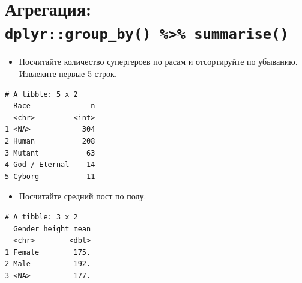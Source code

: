 \documentclass[
]{book}
\newenvironment{Shaded}{\begin{snugshade}}{\end{snugshade}}
\newcommand{\DataTypeTok}[1]{\textcolor[rgb]{0.13,0.29,0.53}{#1}}
\newcommand{\DecValTok}[1]{\textcolor[rgb]{0.00,0.00,0.81}{#1}}
\newcommand{\KeywordTok}[1]{\textcolor[rgb]{0.13,0.29,0.53}{\textbf{#1}}}
\newcommand{\NormalTok}[1]{#1}
\newcommand{\OperatorTok}[1]{\textcolor[rgb]{0.81,0.36,0.00}{\textbf{#1}}}
\newcommand{\OtherTok}[1]{\textcolor[rgb]{0.56,0.35,0.01}{#1}}
\newcommand{\StringTok}[1]{\textcolor[rgb]{0.31,0.60,0.02}{#1}}
\providecommand{\tightlist}{%
  \setlength{\itemsep}{0pt}\setlength{\parskip}{0pt}}
\begin{document}
\hypertarget{solution_group_by}{%
\section{\texorpdfstring{Агрегация: \texttt{dplyr::group\_by()\ \%\textgreater{}\%\ summarise()}}{Агрегация: dplyr::group\_by() \%\textgreater\% summarise()}}\label{solution_group_by}}

\begin{itemize}
\tightlist
\item
  Посчитайте количество супергероев по расам и отсортируйте по убыванию. Извлеките первые 5 строк.
\end{itemize}

\begin{Shaded}
\end{Shaded}

\begin{verbatim}
# A tibble: 5 x 2
  Race              n
  <chr>         <int>
1 <NA>            304
2 Human           208
3 Mutant           63
4 God / Eternal    14
5 Cyborg           11
\end{verbatim}

\begin{itemize}
\tightlist
\item
  Посчитайте средний пост по полу.
\end{itemize}

\begin{Shaded}
\end{Shaded}

\begin{verbatim}
# A tibble: 3 x 2
  Gender height_mean
  <chr>        <dbl>
1 Female        175.
2 Male          192.
3 <NA>          177.
\end{verbatim}
\end{document}
